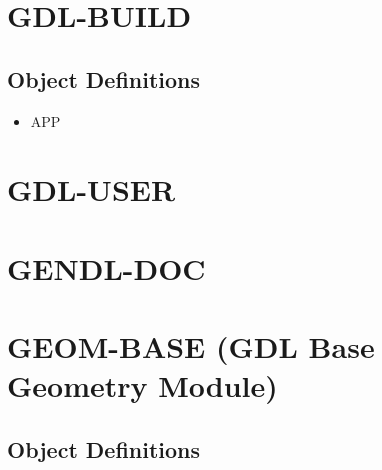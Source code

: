 \documentclass [11pt]{book}
\begin{document}
\section{GDL-BUILD }

\label{sec:gdl-build}





\subsection{Object Definitions}

\label{subsec:objectdefinitions}



\begin{itemize}

\item {}APP

\end{itemize}





\section{GDL-USER }

\label{sec:gdl-user}







\section{GENDL-DOC }

\label{sec:gendl-doc}







\section{GEOM-BASE (GDL Base Geometry Module)}

\label{sec:geom-base(gdlbasegeometrymodule)}





\subsection{Object Definitions}
\end{document}
